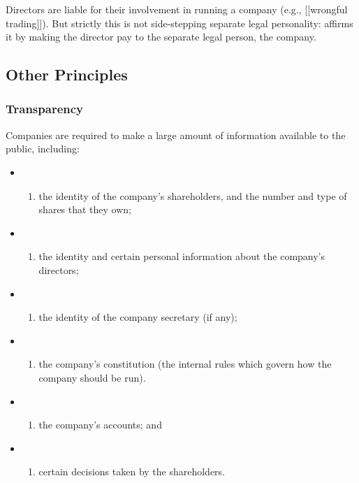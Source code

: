\documentclass[
]{article}
\providecommand{\tightlist}{%
  \setlength{\itemsep}{0pt}\setlength{\parskip}{0pt}}
\begin{document}
Directors are liable for their involvement in running a company (e.g.,
{[}{[}wrongful trading{]}{]}). But strictly this is not side-stepping
separate legal personality: affirms it by making the director pay to the
separate legal person, the company.

\hypertarget{other-principles}{%
\subsection{Other Principles}\label{other-principles}}

\hypertarget{transparency}{%
\subsubsection{Transparency}\label{transparency}}

Companies are required to make a large amount of information available
to the public, including:

\begin{itemize}
\item
  \begin{enumerate}
  \def\labelenumi{(\alph{enumi})}
  \tightlist
  \item
    the identity of the company's shareholders, and the number and type
    of shares that they own;
  \end{enumerate}
\item
  \begin{enumerate}
  \def\labelenumi{(\alph{enumi})}
  \setcounter{enumi}{1}
  \tightlist
  \item
    the identity and certain personal information about the company's
    directors;
  \end{enumerate}
\item
  \begin{enumerate}
  \def\labelenumi{(\alph{enumi})}
  \setcounter{enumi}{2}
  \tightlist
  \item
    the identity of the company secretary (if any);
  \end{enumerate}
\item
  \begin{enumerate}
  \def\labelenumi{(\alph{enumi})}
  \setcounter{enumi}{3}
  \tightlist
  \item
    the company's constitution (the internal rules which govern how the
    company should be run).
  \end{enumerate}
\item
  \begin{enumerate}
  \def\labelenumi{(\alph{enumi})}
  \setcounter{enumi}{4}
  \tightlist
  \item
    the company's accounts; and
  \end{enumerate}
\item
  \begin{enumerate}
  \def\labelenumi{(\alph{enumi})}
  \setcounter{enumi}{5}
  \tightlist
  \item
    certain decisions taken by the shareholders.
  \end{enumerate}
\end{itemize}
\end{document}
